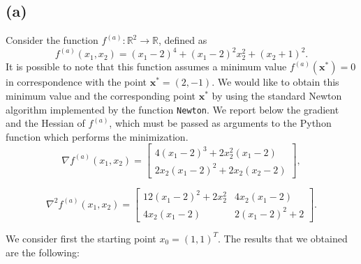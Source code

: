 \documentclass[a4paper,11pt]{article}
\newcommand{\R}{\mathbb{R}}
\begin{document}
	\subsection*{(a)}
	Consider the function $f^{(a)}: \R^{2}\rightarrow \R$, defined as
	\begin{equation}
		f^{(a)}(x_{1},x_{2}) = (x_{1}-2)^{4} + (x_{1}-2)^{2}x_{2}^{2} + (x_{2}+1)^{2}.
	\end{equation}
	It is possible to note that this function assumes a minimum value $f^{(a)}(\textbf{x}^*)=0$ in correspondence with the point $\textbf{x}^*=(2,-1)$. We would like to obtain this minimum value and the corresponding point $\textbf{x}^*$ by using the standard Newton algorithm implemented by the function \texttt{Newton}. We report below the gradient and the Hessian of $f^{(a)}$, which must be passed as arguments to the Python function which performs the minimization.
	\begin{equation}
		\nabla f^{(a)}(x_{1},x_{2}) = \begin{bmatrix}
			4(x_{1}-2)^{3} + 2x_{2}^{2}(x_{1}-2)\\
			2x_{2}(x_{1}-2)^{2} + 2x_{2}(x_{2}-2)
		\end{bmatrix},
	\end{equation}

		\begin{equation}
		\nabla^{2} f^{(a)}(x_{1},x_{2}) = \begin{bmatrix}
			12(x_{1}-2)^{2} + 2x_{2}^{2} & 4x_{2}(x_{1}-2)\\
			4x_{2}(x_{1}-2) & 2(x_{1}-2)^{2} + 2
		\end{bmatrix}.
	\end{equation}
	
	\noindent We consider first the starting point $x_{0}=(1,1)^{T}$. The results that we obtained are the following:
	
\end{document}
